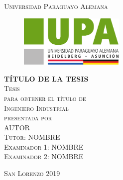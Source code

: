 \documentclass{upa-tesis}
\begin{document}
\thispagestyle{empty}
\begin{center}
	\textsc{\Large Universidad Paraguayo Alemana}\\[5em]
	
	\begin{figure}[h]
		\centering
		\includegraphics[width = 0.45\textwidth]{figures/upa-logo.pdf}
	\end{figure}

	\vspace{5em}

	\textsc{\huge \textbf{TÍTULO DE LA TESIS}}\\[5em]

	\textsc{\large Tesis}\\[1em]

	\textsc{para obtener el título de}\\[1em]

	\textsc{Ingeniero Industrial}\\[1em]

	\textsc{presentada por}\\[1em]

	\textsc{\Large AUTOR}\\[3em]

	\textsc{\small Tutor: NOMBRE}\\[1em]
	\textsc{\small Examinador 1: NOMBRE}\\[1em]
	\textsc{\small Examinador 2: NOMBRE}
\end{center}
\vspace*{\fill}
\textsc{San Lorenzo \hspace*{\fill} 2019}



\newpage
\thispagestyle{empty}
\newpage
{}
\normalsize
\vspace*{6em}
\begingroup
\end{document}
